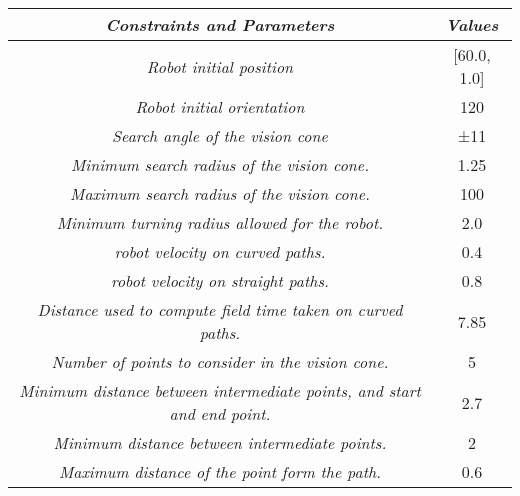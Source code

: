 \begin{table}[]
    \begin{tabular}{|c|c|}
    \hline
    \rowcolor[HTML]{FFCC67} 
    \textit{\textbf{Constraints and Parameters}}                                    & \textit{\textbf{Values}} \\ \hline
    \rowcolor[HTML]{BBF6F4} 
    \textit{Robot initial position}                                                 & {[}60.0, 1.0{]}          \\ \hline
    \rowcolor[HTML]{BBF6F4} 
    \textit{Robot initial orientation}                                              & 120                      \\ \hline
    \rowcolor[HTML]{BBF6F4} 
    \textit{Search angle of the vision cone}                                        & ±11                      \\ \hline
    \rowcolor[HTML]{BBF6F4} 
    \textit{Minimum search radius of the vision cone.}                              & 1.25                     \\ \hline
    \rowcolor[HTML]{BBF6F4} 
    \textit{Maximum search radius of the vision cone.}                              & 100                      \\ \hline
    \rowcolor[HTML]{BBF6F4} 
    \textit{Minimum turning radius allowed for the robot.}                          & 2.0                      \\ \hline
    \rowcolor[HTML]{BBF6F4} 
    \textit{robot velocity on curved paths.}                                        & 0.4                      \\ \hline
    \rowcolor[HTML]{BBF6F4} 
    \textit{robot velocity on straight paths.}                                      & 0.8                      \\ \hline
    \rowcolor[HTML]{BBF6F4} 
    \textit{Distance used to compute field time taken on curved paths.}             & 7.85                     \\ \hline
    \rowcolor[HTML]{BBF6F4} 
    \textit{Number of points to consider in the vision cone.}                       & 5                        \\ \hline
    \rowcolor[HTML]{BEF7F5} 
    \textit{Minimum distance between intermediate points, and start and end point.} & 2.7                      \\ \hline
    \rowcolor[HTML]{BEF7F5} 
    \textit{Minimum distance between intermediate points.}                          & 2                        \\ \hline
    \rowcolor[HTML]{BEF7F5} 
    \textit{Maximum distance of the point form the path.}                           & 0.6                      \\ \hline
    \end{tabular}
    \end{table}



